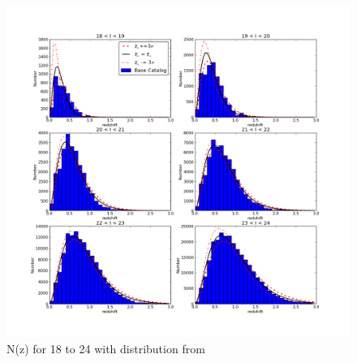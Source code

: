 \documentclass[]{article}
\begin{document}
\begin{figure}
\centering
\includegraphics[width=5in]{validation_figures/Nofz_18_24.png}
\caption{N(z) for 18 to 24 with distribution from \cite{coil04}\label{fig:nofz18_24}}
\end{figure}
\clearpage
\end{document}

